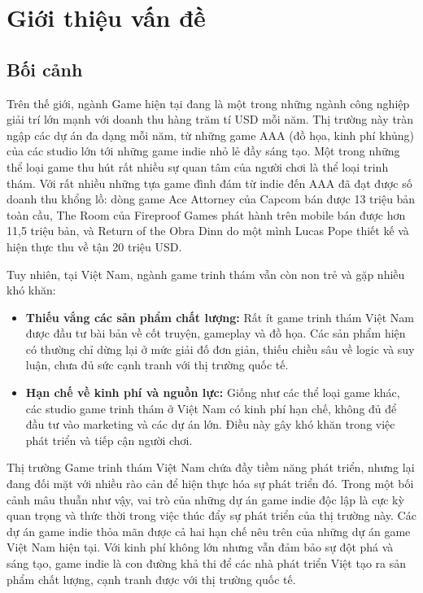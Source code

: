 \section{Giới thiệu vấn đề}
\subsection{Bối cảnh}
Trên thế giới, ngành Game hiện tại đang là một trong những ngành công nghiệp giải trí lớn mạnh với doanh thu hàng trăm tí USD mỗi năm. Thị trường này tràn ngập các dự án đa dạng mỗi năm, từ những game AAA (đồ họa, kinh phí khủng) của các studio lớn tới những game indie nhỏ lẻ đầy sáng tạo. Một trong những thể loại game thu hút rất nhiều sự quan tâm của người chơi là thể loại trinh thám. Với rất nhiều những tựa game đình đám từ indie đến AAA đã đạt được số doanh thu khổng lồ: dòng game Ace Attorney của Capcom bán được 13 triệu bản toàn cầu, The Room của Fireproof Games phát hành trên mobile bán được hơn 11,5 triệu bản, và Return of the Obra Dinn do một mình Lucas Pope thiết kế và hiện thực thu về tận 20 triệu USD. 

Tuy nhiên, tại Việt Nam, ngành game trinh thám vẫn còn non trẻ và gặp nhiều khó khăn:
\begin{itemize}
    \item \textbf{Thiếu vắng các sản phẩm chất lượng:} Rất ít game trinh thám Việt Nam được đầu tư bài bản về cốt truyện, gameplay và đồ họa. Các sản phẩm hiện có thường chỉ dừng lại ở mức giải đố đơn giản, thiếu chiều sâu về logic và suy luận, chưa đủ sức cạnh tranh với thị trường quốc tế.
    
    \item \textbf{Hạn chế về kinh phí và nguồn lực:} Giống như các thể loại game khác, các studio game trinh thám ở Việt Nam có kinh phí hạn chế, không đủ để đầu tư vào marketing và các dự án lớn. Điều này gây khó khăn trong việc phát triển và tiếp cận người chơi.
\end{itemize}

Thị trường Game trinh thám Việt Nam chứa đầy tiềm năng phát triển, nhưng lại đang đối mặt với nhiều rào cản để hiện thực hóa sự phát triển đó. Trong một bối cảnh mâu thuẫn như vậy, vai trò của những dự án game indie độc lập là cực kỳ quan trọng và thức thời trong việc thúc đẩy sự phát triển của thị trường này. Các dự án game indie thỏa mãn được cả hai hạn chế nêu trên của những dự án game Việt Nam hiện tại. Với kinh phí không lớn nhưng vẫn đảm bảo sự đột phá và sáng tạo, game indie là con đường khả thi để các nhà phát triển Việt tạo ra sản phẩm chất lượng, cạnh tranh được với thị trường quốc tế.


